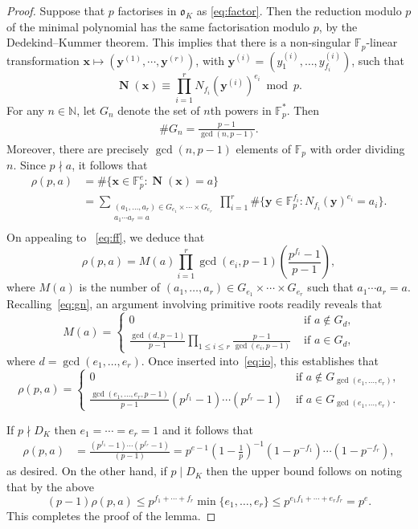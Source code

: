 \documentclass[11pt,letterpaper]{amsart}
\renewcommand{\leq}{\leqslant}
\theoremstyle{definition}
\numberwithin{equation}{section}
\newcommand\FF{\mathbb{F}}
\newcommand\NN{\mathbb{N}}
\newcommand{\x}{\mathbf{x}}
\newcommand{\y}{\mathbf{y}}
\DeclareMathOperator{\nf}{\mathbf{N}}
\newcommand{\fo}{\mathfrak{o}}
\newcommand{\0}{\mathbf{0}}
\begin{document}
\begin{proof}
Suppose that  $p$ factorises in $\fo_K$ as 
\eqref{eq:factor}. Then the reduction modulo $p$ of the minimal  
polynomial has the same factorisation modulo $p$, by the Dedekind--Kummer  
theorem.  This implies that there is a  
non-singular $\FF_p$-linear transformation 
$\x\mapsto (\y^{(1)},\cdots, \y^{(r)})$, 
with $\y^{(i)}=(y_1^{(i)},\dots, y_{f_i}^{(i)})$, such that 
$$
\nf(\x)\equiv \prod_{i=1}^r N_{f_i}(\y^{(i)})^{e_i} \bmod{p}.
$$
For any $n\in \NN$, 
let $G_n$ denote the set of $n$th powers in $\FF_p^*$.
Then 
\begin{align}\label{eq:gn}
\#G_n=\frac{p-1}{\gcd(n,p-1)}.
\end{align}
Moreover, there are precisely $\gcd(n,p-1)$ elements of $\FF_p$ with order dividing $n$.
Since $p\nmid a$, it follows that
\begin{align*}
\rho(p,a)
&= \#\{  \x\in \FF_p^e: \nf(\x)=a\}\\
&= \sum_{\substack{(a_1,\dots,a_r)\in  G_{e_1}\times \cdots \times G_{e_r}\\
a_1\cdots a_r=a\\
}}
\prod_{i=1}^r 
 \#\{  \y\in \FF_p^{f_i}: N_{f_i}(\y)^{e_i}=a_i\}.
\end{align*}
On appealing to 
~\eqref{eq:ff}, we deduce that 
 \begin{equation}\label{eq:io}
\rho(p,a)
= M(a)
\prod_{i=1}^r 
\gcd(e_i,p-1)
\left(\frac{p^{f_i}-1}{p-1}\right),
\end{equation}
where $M(a)$ is the number of 
$(a_1,\dots,a_r)\in  G_{e_1}\times \cdots \times G_{e_r}$ such that 
$a_1\cdots a_r=a.$
Recalling~\eqref{eq:gn}, an argument involving 
primitive roots readily reveals that
$$
M(a)=
\begin{cases} 
0 &  \text{ if $a\not\in G_d$,}\\
 \frac{\gcd(d,p-1)}{p-1}\prod_{1\leq i\leq r} \frac{p-1}{\gcd(e_i,p-1)} &
 \text{ if $a\in G_d$,}
\end{cases}
$$
where $d=\gcd(e_1,\dots,e_r)$. Once inserted into~\eqref{eq:io}, this 
establishes that 
$$
\rho(p,a) =\begin{cases}
0 & \text{ if $a\not\in G_{\gcd(e_1,\dots,e_r)}$,}\\
\frac{\gcd(e_1,\dots,e_r,p-1)}{p-1}(p^{f_1}-1)\cdots(p^{f_r}-1) & \text{ if $a\in G_{\gcd(e_1,\dots,e_r)}$.}
\end{cases}
$$

If $p\nmid D_K$ then $e_1=\cdots=e_r=1$ and it follows that 
 \begin{align*}
\rho(p,a)
&= 
\frac{(p^{f_1}-1)\cdots (p^{f_r}-1)}{(p-1)}= p^{e-1} \left(1-\frac{1}{p}\right)^{-1}
(1-p^{-f_1})\cdots (1-p^{-f_r}),
\end{align*}
as desired.  On the other hand, if $p\mid D_K$ then the upper bound follows on noting that by the above 
$$
(p-1)\rho(p,a)\leq p^{f_1+\cdots+f_r}\min\{e_1,\dots,e_r\}\leq p^{e_1f_1+\cdots+e_rf_r}=p^e.
$$
This completes the proof of the lemma.
\end{proof}
\end{document}

